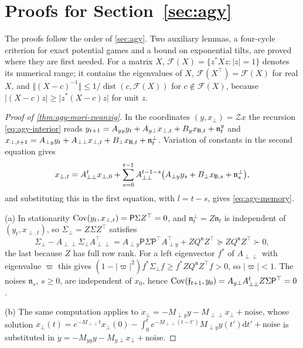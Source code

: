 \section{Proofs for \texorpdfstring{Section~\ref{sec:agy}}{closure, agency and interaction}}\label{app:agy}

The proofs follow the order of \cref{sec:agy}. Two auxiliary lemmas, a four-cycle criterion for exact potential games and a bound on exponential tilts, are proved where they are first needed. For a matrix $X$, $\mathcal F(X)=\{z^\ast Xz:\lvert z\rvert=1\}$ denotes its numerical range; it contains the eigenvalues of $X$, $\mathcal F(X^\top)=\mathcal F(X)$ for real $X$, and $\Vert(X-c)^{-1}\Vert\le1/\operatorname{dist}(c,\mathcal F(X))$ for $c\notin\mathcal F(X)$, because $\lvert(X-c)z\rvert\ge\lvert z^\ast(X-c)z\rvert$ for unit $z$.

\begin{proof}[Proof of \cref{thm:agy-mori-zwanzig}]
In the coordinates $(y,x_\perp)=\mathcal Zx$ the recursion \eqref{eq:agy-interior} reads $y_{t+1}=A_{yy}y_t+A_{y\perp}x_{\perp,t}+B_yx_{\mathsf{B},t}+\mathfrak n^y_t$ and $x_{\perp,t+1}=A_{\perp y}y_t+A_{\perp\perp}x_{\perp,t}+B_\perp x_{\mathsf{B},t}+\mathfrak n^\perp_t$. Variation of constants in the second equation gives
\begin{equation*}
x_{\perp,t}=A_{\perp\perp}^tx_{\perp,0}+\sum_{s=0}^{t-1}A_{\perp\perp}^{t-1-s}\bigl(A_{\perp y}y_s+B_\perp x_{\mathsf{B},s}+\mathfrak n^\perp_s\bigr),
\end{equation*}
and substituting this in the first equation, with $l=t-s$, gives \eqref{eq:agy-memory}.

(a) In stationarity $\operatorname{Cov}(y_t,x_{\perp,t})=\mathsf P\Sigma Z^\top=0$, and $\mathfrak n^\perp_t=Z\mathfrak n_t$ is independent of $(y_t,x_{\perp,t})$, so $\Sigma_\perp=Z\Sigma Z^\top$ satisfies
\begin{equation*}
\Sigma_\perp-A_{\perp\perp}\Sigma_\perp A_{\perp\perp}^\top=A_{\perp y}\mathsf P\Sigma\mathsf P^\top A_{\perp y}^\top+ZQ^{\mathfrak n}Z^\top\succeq ZQ^{\mathfrak n}Z^\top\succ0,
\end{equation*}
the last because $Z$ has full row rank. For a left eigenvector $f^\ast$ of $A_{\perp\perp}$ with eigenvalue $\varpi$ this gives $(1-\lvert\varpi\rvert^2)f^\ast\Sigma_\perp f\ge f^\ast ZQ^{\mathfrak n}Z^\top f>0$, so $\lvert\varpi\rvert<1$. The noises $\mathfrak n_s$, $s\ge0$, are independent of $x_0$, hence $\operatorname{Cov}(\mathfrak f_{t+1},y_0)=A_{y\perp}A_{\perp\perp}^tZ\Sigma\mathsf P^\top=0$.

(b) The same computation applies to $\dot x_\perp=-M_{\perp y}y-M_{\perp\perp}x_\perp+\text{noise}$, whose solution $x_\perp(t)=e^{-M_{\perp\perp}t}x_\perp(0)-\int_0^te^{-M_{\perp\perp}(t-t')}M_{\perp y}y(t')\mathrm dt'+\text{noise}$ is substituted in $\dot y=-M_{yy}y-M_{y\perp}x_\perp+\text{noise}$.
\end{proof}

